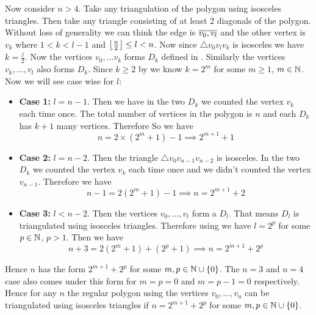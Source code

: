 \documentclass[a4paper, 11pt]{article}
\begin{document}
{\begin{itemize}[label=$\bullet$]
\begin{itemize}
Now consider $n>4$. Take any triangulation of the polygon using isosceles triangles. Then take  any triangle consisting of at least 2 diagonals of the polygon. Without loss of generality we can think the edge is $\overline{v_0,v_l}$ and the other vertex is $v_k$ where $1<k<l-1$ and $\left\lfloor\frac{n}2\right\rfloor\leq l< n$. Now since $\triangle v_0v_lv_k$ is isosceles we have $k=\frac{l}2$. Now the vertices $v_0,\dots  v_k$ forms $D_{k}$ defined in . Similarly the vertices $v_k,\dots, v_l$ also forms $D_k$. Since $k\geq 2$ by  we know $k=2^m$ for some $m\geq1$, $m\in\mathbb{N}$.  Now we will see case wise for $l$:\begin{itemize}
	\item \textbf{Case 1:} $l=n-1$. Then we have in the two $D_k$ we counted the vertex $v_k$ each time once. The total number of vertices in the polygon is $n$ and each $D_k$ has $k+1$ many vertices. Therefore So we have $$n=2\times (2^m+1)-1\implies 2^{m+1}+1$$
	\item \textbf{Case 2:} $l=n-2$. Then the triangle $\triangle v_0v_{n-1}v_{n-2}$ is isosceles. In the two $D_k$ we counted the vertex $v_k$ each time once and we didn't counted the vertex $v_{n-1}$. Therefore we have $$n-1=2(2^m+1)-1\implies n=2^{m+1}+2$$
	\item \textbf{Case 3:} $l<n-2$. Then the vertices $v_0,\dots, v_l$ form a $D_l$. That means $D_l$ is triangulated using isosceles triangles. Therefore using  we have $l=2^p$ for some $p\in\mathbb{N}$, $p>1$. Then we have $$n+3=2(2^m+1)+(2^p+1)\implies n=2^{m+1}+2^p$$
\end{itemize}
Hence $n$ has the form $2^{m+1}+2^p$ for some $m,p\in\mathbb{N}\cup \{0\}$. The $n=3$ and $n=4$ case also comes under this form for $m=p=0$ and $m=p-1=0$ respectively. Hence for any $n$ the regular polygon using the vertices $v_0,\dots, v_n$ can be triangulated using isosceles triangles if $n=2^{m+1}+2^p$ for some $m,p\in\mathbb{N}\cup\{0\}$.


\end{itemize}
\end{itemize}}
\end{document}

